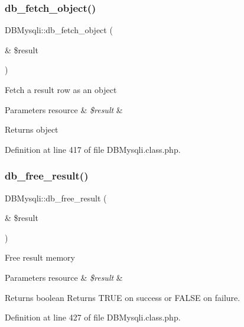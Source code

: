 \subsubsection{\texorpdfstring{db\+\_\+fetch\+\_\+object()}{db\_fetch\_object()}}
{\footnotesize\ttfamily D\+B\+Mysqli\+::db\+\_\+fetch\+\_\+object (\begin{DoxyParamCaption}\item[{\&}]{\$result }\end{DoxyParamCaption})}

Fetch a result row as an object 
\begin{DoxyParams}[1]{Parameters}
resource & {\em \$result} & \\
\hline
\end{DoxyParams}
\begin{DoxyReturn}{Returns}
object 
\end{DoxyReturn}


Definition at line 417 of file D\+B\+Mysqli.\+class.\+php.

\hypertarget{classDBMysqli_a8639ebaca8bae119797a084af68750cc}{}\label{classDBMysqli_a8639ebaca8bae119797a084af68750cc} 
\subsubsection{\texorpdfstring{db\+\_\+free\+\_\+result()}{db\_free\_result()}}
{\footnotesize\ttfamily D\+B\+Mysqli\+::db\+\_\+free\+\_\+result (\begin{DoxyParamCaption}\item[{\&}]{\$result }\end{DoxyParamCaption})}

Free result memory 
\begin{DoxyParams}[1]{Parameters}
resource & {\em \$result} & \\
\hline
\end{DoxyParams}
\begin{DoxyReturn}{Returns}
boolean Returns T\+R\+UE on success or F\+A\+L\+SE on failure. 
\end{DoxyReturn}


Definition at line 427 of file D\+B\+Mysqli.\+class.\+php.

\hypertarget{classDBMysqli_a080939c13758f00ecd0092eda6cd2452}{}\label{classDBMysqli_a080939c13758f00ecd0092eda6cd2452} 
